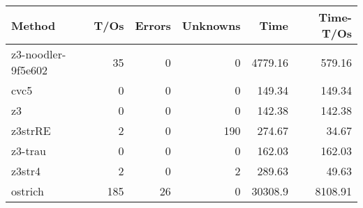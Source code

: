 \begin{tabular}{lrrrrr}
\hline
 Method             &   T/Os &   Errors &   Unknowns &     Time &   Time-T/Os \\
\hline
 z3-noodler-9f5e602 &     35 &        0 &          0 &  4779.16 &      579.16 \\
 cvc5               &      0 &        0 &          0 &   149.34 &      149.34 \\
 z3                 &      0 &        0 &          0 &   142.38 &      142.38 \\
 z3strRE            &      2 &        0 &        190 &   274.67 &       34.67 \\
 z3-trau            &      0 &        0 &          0 &   162.03 &      162.03 \\
 z3str4             &      2 &        0 &          2 &   289.63 &       49.63 \\
 ostrich            &    185 &       26 &          0 & 30308.9  &     8108.91 \\
\hline
\end{tabular}
